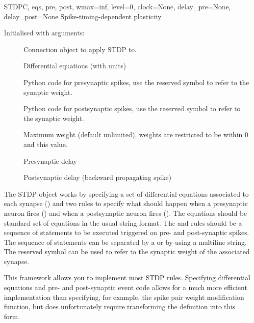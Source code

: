 \documentclass[letterpaper,10pt,english]{manual}
\begin{document}
\hypertarget{brian.STDP}{}\begin{classdesc}{STDP}{C, eqs, pre, post, wmax=inf, level=0, clock=None, delay\_pre=None, delay\_post=None}
Spike-timing-dependent plasticity

Initialised with arguments:
\begin{description}
\item[] \leavevmode
Connection object to apply STDP to.

\item[] \leavevmode
Differential equations (with units)

\item[] \leavevmode
Python code for presynaptic spikes, use the reserved symbol  to
refer to the synaptic weight.

\item[] \leavevmode
Python code for postsynaptic spikes, use the reserved symbol  to
refer to the synaptic weight.

\item[] \leavevmode
Maximum weight (default unlimited), weights are restricted to be within
0 and this value.

\item[] \leavevmode
Presynaptic delay

\item[] \leavevmode
Postsynaptic delay (backward propagating spike)

\end{description}

The STDP object works by specifying a set of differential equations
associated to each synapse () and two rules to specify what should
happen when a presynaptic neuron fires () and when a postsynaptic
neuron fires (). The equations should be standard set of equations
in the usual string format. The  and  rules should be a
sequence of statements to be executed triggered on pre- and post-synaptic
spikes. The sequence of statements can be separated by a \code{;} or by
using a multiline string. The reserved symbol  can be used to refer
to the synaptic weight of the associated synapse.

This framework allows you to implement most STDP rules. Specifying
differential equations and pre- and post-synaptic event code allows for a
much more efficient implementation than specifying, for example, the
spike pair weight modification function, but does unfortunately require
transforming the definition into this form.


\end{classdesc}
\end{document}
